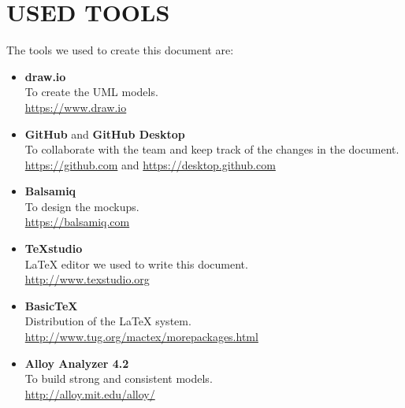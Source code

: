 \section{USED TOOLS}
The tools we used to create this document are:
\begin{itemize}
	\item \textbf{draw.io} \\
	To create the UML models.\\
	\url{https://www.draw.io}
	\item \textbf{GitHub} and \textbf{GitHub Desktop} \\
	To collaborate with the team and keep track of the changes in the document. \\
	\url{https://github.com} and \url{https://desktop.github.com}
	\item \textbf{Balsamiq} \\
	To design the mockups. \\
	\url{https://balsamiq.com}
	\item \textbf{TeXstudio} \\
	LaTeX editor we used to write this document. \\
	\url{http://www.texstudio.org}
	\item \textbf{BasicTeX} \\
	Distribution of the LaTeX system. \\
	\url{http://www.tug.org/mactex/morepackages.html}
	\item \textbf{Alloy Analyzer 4.2} \\
	To build strong and consistent models. \\
	\url{http://alloy.mit.edu/alloy/}
\end{itemize}